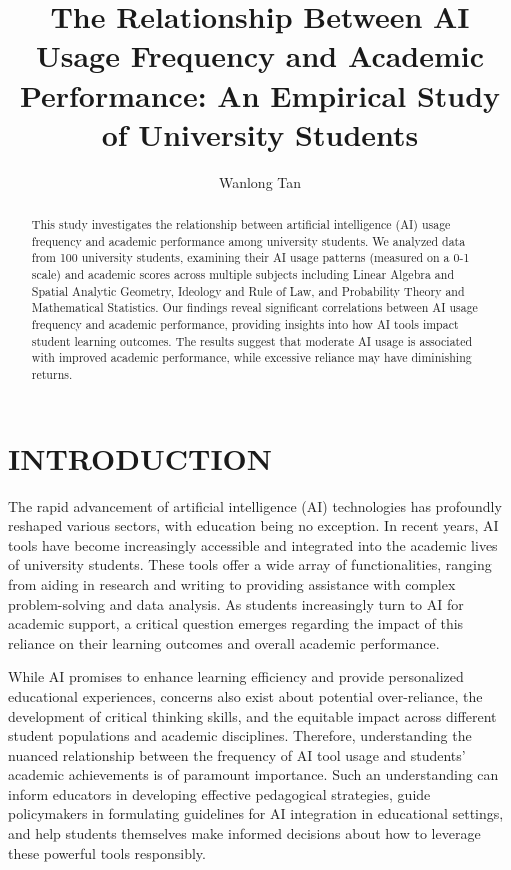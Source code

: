 \documentclass[manuscript,screen,review]{acmart}
\begin{document}
\title{The Relationship Between AI Usage Frequency and Academic Performance: An Empirical Study of University Students}

\author{Wanlong Tan}

\begin{abstract}
This study investigates the relationship between artificial intelligence (AI) usage frequency and academic performance among university students. We analyzed data from 100 university students, examining their AI usage patterns (measured on a 0-1 scale) and academic scores across multiple subjects including Linear Algebra and Spatial Analytic Geometry, Ideology and Rule of Law, and Probability Theory and Mathematical Statistics. Our findings reveal significant correlations between AI usage frequency and academic performance, providing insights into how AI tools impact student learning outcomes. The results suggest that moderate AI usage is associated with improved academic performance, while excessive reliance may have diminishing returns.
\end{abstract}
\maketitle
\section{INTRODUCTION}

The rapid advancement of artificial intelligence (AI) technologies has profoundly reshaped various sectors, with education being no exception. In recent years, AI tools have become increasingly accessible and integrated into the academic lives of university students. These tools offer a wide array of functionalities, ranging from aiding in research and writing to providing assistance with complex problem-solving and data analysis. As students increasingly turn to AI for academic support, a critical question emerges regarding the impact of this reliance on their learning outcomes and overall academic performance.

While AI promises to enhance learning efficiency and provide personalized educational experiences, concerns also exist about potential over-reliance, the development of critical thinking skills, and the equitable impact across different student populations and academic disciplines. Therefore, understanding the nuanced relationship between the frequency of AI tool usage and students' academic achievements is of paramount importance. Such an understanding can inform educators in developing effective pedagogical strategies, guide policymakers in formulating guidelines for AI integration in educational settings, and help students themselves make informed decisions about how to leverage these powerful tools responsibly.
\end{document}
